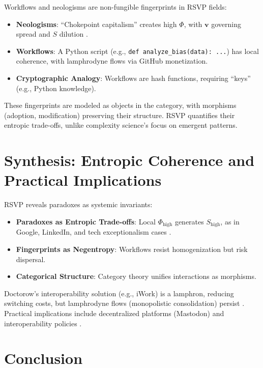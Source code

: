\documentclass{article}
\begin{document}
Workflows and neologisms are non-fungible fingerprints in RSVP fields:

\begin{itemize}
    \item \textbf{Neologisms}: ``Chokepoint capitalism'' creates high $\Phi$, with $\mathbf{v}$ governing spread and $S$ dilution \cite{giblin2022chokepoint,doctorow2023internetcon}.
    \item \textbf{Workflows}: A Python script (e.g., \texttt{def analyze\_bias(data): ...}) has local coherence, with lamphrodyne flows via GitHub monetization.
    \item \textbf{Cryptographic Analogy}: Workflows are hash functions, requiring ``keys'' (e.g., Python knowledge).
\end{itemize}

These fingerprints are modeled as objects in the category, with morphisms (adoption, modification) preserving their structure. RSVP quantifies their entropic trade-offs, unlike complexity science’s focus on emergent patterns.

\section{Synthesis: Entropic Coherence and Practical Implications}
\label{sec:synthesis}

RSVP reveals paradoxes as systemic invariants:

\begin{itemize}
    \item \textbf{Paradoxes as Entropic Trade-offs}: Local $\Phi_{\text{high}}$ generates $S_{\text{high}}$, as in Google, LinkedIn, and tech exceptionalism cases \cite{doctorow2023internetcon,amos2024}.
    \item \textbf{Fingerprints as Negentropy}: Workflows resist homogenization but risk dispersal.
    \item \textbf{Categorical Structure}: Category theory unifies interactions as morphisms.
\end{itemize}

Doctorow’s interoperability solution (e.g., iWork) is a lamphron, reducing switching costs, but lamphrodyne flows (monopolistic consolidation) persist \cite{doctorow2023internetcon}. Practical implications include decentralized platforms (Mastodon) and interoperability policies \cite{eu2025}.

\section{Conclusion}
\end{document}

